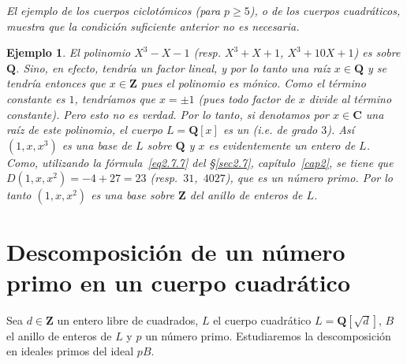 \documentclass[bibtotoc,leqno,spanish]{amsbook}
\let\emph\relax %
\newcommand{\QQ}{\mathbf{Q}}
\newcommand{\ZZ}{\mathbf{Z}}
\newcommand{\CC}{\mathbf{C}}
\numberwithin{equation}{section}
\newenvironment{comm}%
	{\begin{list}{}{\setlength{\leftmargin}{2\parindent}\setlength{\topsep}{\baselineskip}}\item\itshape}
	{\end{list}}
\theoremstyle{note}
\theoremstyle{note}
\theoremstyle{rem}
\newtheorem*{example*}{Ejemplo}
\numberwithin{theorem}{section}
\numberwithin{proposition}{section}
\numberwithin{definition}{section}
\numberwithin{lemma}{section}
\numberwithin{corollary}{section}
\numberwithin{example}{section}
\numberwithin{footnote}{section}%
\begin{document}
\begin{comm}
El ejemplo de los cuerpos ciclot\'omicos (para $p\geq 5$), o de los cuerpos cuadr\'aticos, muestra que
la condici\'on suficiente anterior no es necesaria.
\end{comm}

\begin{example*}
El polinomio $X^{3}-X-1$ (resp. $X^{3}+X+1$, $X^{3}+10X+1$) es \emph{irreducible} sobre $\QQ$.
Sino, en efecto, tendr\'ia un factor lineal, y por lo tanto una ra\'iz $x\in\QQ$ y se tendr\'ia entonces
que $x\in\ZZ$ pues el polinomio es m\'onico. Como el t\'ermino constante es $1$, tendr\'iamos que
$x=\pm 1$ (pues todo factor de $x$ divide al t\'ermino constante). Pero esto no es verdad. Por lo tanto,
si denotamos por $x\in\CC$ una ra\'iz de este polinomio, el cuerpo $L = \QQ[x]$ es un \emph{cuerpo c\'ubico}
(i.e. de grado $3$). As\'i $(1,x,x^{3})$ es una base de $L$ sobre $\QQ$ y $x$ es evidentemente un entero de
$L$. Como, utilizando la f\'ormula~\eqref{eq2.7.7} del \S\ref{sec2.7}, cap\'itulo~\ref{cap2}, se tiene
que $D(1,x,x^{2}) = -4+27 = 23$ (resp.~$31$,~$4027$), que es un n\'umero primo.  Por lo tanto
$(1,x,x^{2})$ es una base sobre $\ZZ$ del anillo de enteros de $L$.
\end{example*}

\section{Descomposici\'on de un n\'umero primo en un cuerpo cuadr\'atico}\label{sec5.4}

Sea $d\in\ZZ$ un entero libre de cuadrados, $L$ el cuerpo cuadr\'atico $L = \QQ[\sqrt{d}]$,
$B$ el anillo de enteros de $L$ y $p$ un n\'umero primo. Estudiaremos la descomposici\'on en ideales
primos del ideal $pB$.
\end{document}
